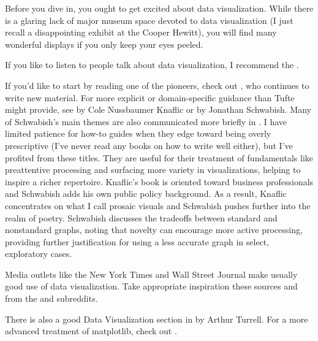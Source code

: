 Before you dive in, you ought to get excited about data visualization. While there is a glaring lack of major museum space devoted to data visualization (I just recall a disappointing exhibit at the Cooper Hewitt), you will find many wonderful displays if you only keep your eyes peeled. 
 
If you like to listen to people talk about data visualization, I recommend the . 

If you'd like to start by reading one of the pioneers, check out , who continues to write new material. For more explicit or domain-specific guidance than Tufte might provide, see  by Cole Nussbaumer Knaflic or  by Jonathan Schwabish. Many of Schwabish's main themes are also communicated more briefly in \cite{schwabish2014economist}. I have limited patience for how-to guides when they edge toward being overly prescriptive (I've never read any books on how to write well either), but I've profited from these titles. They are useful for their treatment of fundamentals like preattentive processing and surfacing more variety in visualizations, helping to inspire a richer repertoire. Knaflic's book is oriented toward business professionals and Schwabish adds his own public policy background. As a result, Knaflic concentrates on what I call prosaic visuals  and Schwabish pushes further into the realm of poetry. Schwabish discusses the tradeoffs between standard and nonstandard graphs, noting that novelty can encourage more active processing, providing further justification for using a less accurate graph in select, exploratory cases.

Media outlets like the New York Times and Wall Street Journal make usually good use of data visualization. Take appropriate inspiration these sources and from the   and  subreddits.

There is also a good Data Visualization section in  by Arthur Turrell. For a more advanced treatment of matplotlib, check out .
